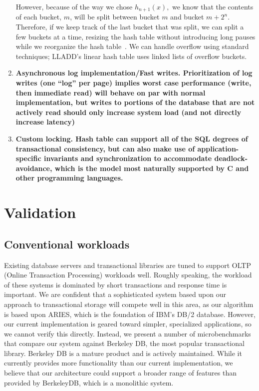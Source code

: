 \documentclass[letterpaper,english]{article}
\begin{document}
\begin{enumerate}
However, because of the way we chose $h_{n+1}(x),$ we know that the
contents of each bucket, $m$, will be split between bucket $m$ and
bucket $m+2^{n}$. Therefore, if we keep track of the last bucket
that was split, we can split a few buckets at a time, resizing the
hash table without introducing long pauses while we reorganize the
hash table~\cite{lht}. We can handle overflow using standard techniques;
LLADD's linear hash table uses linked lists of overflow buckets.


  \item {\bf Asynchronous log implementation/Fast writes. Prioritization of
  log writes (one {}``log'' per page) implies worst case performance
  (write, then immediate read) will behave on par with normal
  implementation, but writes to portions of the database that are not
  actively read should only increase system load (and not directly
  increase latency)}

  \item {\bf Custom locking. Hash table can support all of the SQL degrees
  of transactional consistency, but can also make use of
  application-specific invariants and synchronization to accommodate
  deadlock-avoidance, which is the model most naturally supported by C
  and other programming languages.}


\end{enumerate}

\section{Validation}


\subsection{Conventional workloads}

Existing database servers and transactional libraries are tuned to
support OLTP (Online Transaction Processing) workloads well.  Roughly
speaking, the workload of these systems is dominated by short
transactions and response time is important.  We are confident that a
sophisticated system based upon our approach to transactional storage
will compete well in this area, as our algorithm is based upon ARIES,
which is the foundation of IBM's DB/2 database.  However, our current
implementation is geared toward simpler, specialized applications, so
we cannot verify this directly.  Instead, we present a number of
microbenchmarks that compare our system against Berkeley DB, the most
popular transactional library.  Berkeley DB is a mature product and is
actively maintained.  While it currently provides more functionality
than our current implementation, we believe that our architecture
could support a broader range of features than provided by BerkeleyDB,
which is a monolithic system.
\end{document}
